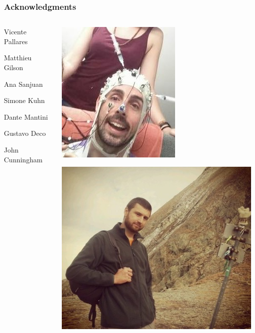 \documentclass[final]{beamer}
\begin{document}
\begin{frame}
\frametitle{Acknowledgments}
\begin{columns}
\begin{column}{0.5\textwidth}
\begin{center}
	\alert<2>{Vicente Pallares}\\
\vspace{1cm}

\alert<2>{Matthieu Gilson}\\
\vspace{1cm}

\small Ana Sanjuan\\
\vspace{0.5cm}

\small Simone Kuhn\\
\vspace{0.5cm}

\small Dante Mantini\\
\vspace{0.5cm}

\small Gustavo Deco\\
\vspace{0.5cm}

\normalsize John Cunningham\\
\end{center}
\end{column}
\begin{column}{0.5\textwidth}
\includegraphics[width=0.5\columnwidth,valign=t]{vicente2}
\vspace{0.5cm}

\includegraphics[width=0.5\columnwidth,valign=t]{matt}
\end{column}
\end{columns}
\end{frame}
\end{document}
